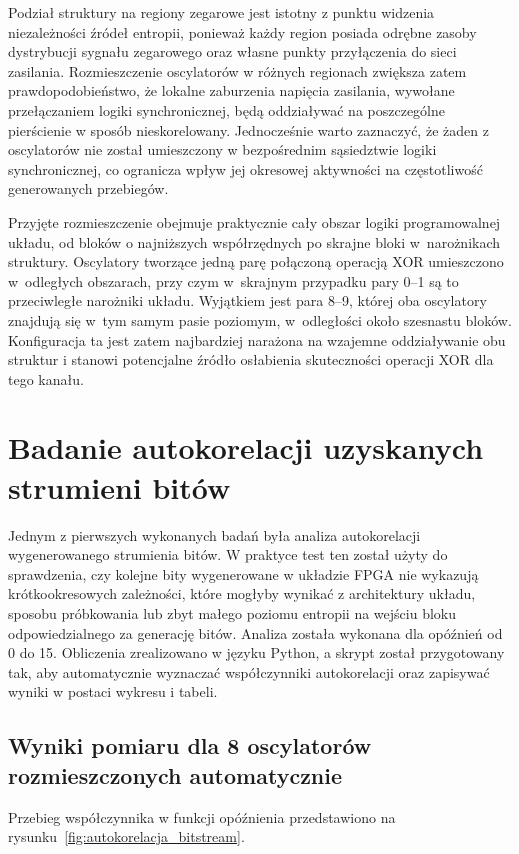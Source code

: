 Podział struktury na regiony zegarowe jest istotny z punktu widzenia niezależności
źródeł entropii, ponieważ każdy region posiada odrębne zasoby dystrybucji sygnału
zegarowego oraz własne punkty przyłączenia do sieci zasilania. Rozmieszczenie
oscylatorów w różnych regionach zwiększa zatem prawdopodobieństwo, że lokalne
zaburzenia napięcia zasilania, wywołane przełączaniem logiki synchronicznej, będą
oddziaływać na poszczególne pierścienie w sposób nieskorelowany. Jednocześnie warto
zaznaczyć, że żaden z oscylatorów nie został umieszczony w bezpośrednim sąsiedztwie
logiki synchronicznej, co ogranicza wpływ jej okresowej aktywności na częstotliwość
generowanych przebiegów.

Przyjęte rozmieszczenie obejmuje praktycznie cały obszar logiki programowalnej układu,
od bloków o najniższych współrzędnych po skrajne bloki w~narożnikach struktury. Oscylatory
tworzące jedną parę połączoną operacją XOR umieszczono w~odległych obszarach, przy czym
w~skrajnym przypadku pary 0--1 są to przeciwległe narożniki układu. Wyjątkiem jest para
8--9, której oba oscylatory znajdują się w~tym samym pasie poziomym, w~odległości około
szesnastu bloków. Konfiguracja ta jest zatem najbardziej narażona na wzajemne
oddziaływanie obu struktur i stanowi potencjalne źródło osłabienia skuteczności operacji
XOR dla tego kanału.
\FloatBarrier

\section{Badanie autokorelacji uzyskanych strumieni bitów}

Jednym z pierwszych wykonanych badań była analiza autokorelacji wygenerowanego strumienia
bitów. W praktyce test ten został użyty do sprawdzenia, czy kolejne bity wygenerowane w
układzie FPGA nie wykazują krótkookresowych zależności, które mogłyby wynikać z architektury
układu, sposobu próbkowania lub zbyt małego poziomu entropii na wejściu bloku
odpowiedzialnego za generację bitów. Analiza została wykonana dla opóźnień od 0 do 15. Obliczenia
zrealizowano w języku Python, a skrypt został przygotowany tak, aby automatycznie wyznaczać
współczynniki autokorelacji oraz zapisywać wyniki w postaci wykresu i tabeli.

\subsection{Wyniki pomiaru dla 8 oscylatorów rozmieszczonych automatycznie}
Przebieg współczynnika
w funkcji opóźnienia przedstawiono na rysunku~\ref{fig:autokorelacja_bitstream}.

